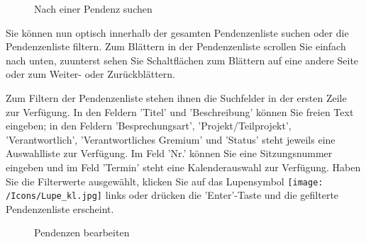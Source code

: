 \begin{figure}[H]
\caption{Nach einer Pendenz suchen}
\end{figure}

Sie können nun optisch innerhalb der gesamten Pendenzenliste suchen oder die Pendenzenliste filtern. Zum Blättern in der Pendenzenliste scrollen Sie einfach nach unten, zuunterst sehen Sie Schaltflächen zum Blättern auf eine andere Seite oder zum Weiter- oder Zurückblättern.

\begin{figure}[H]
\end{figure}

Zum Filtern der Pendenzenliste stehen ihnen die Suchfelder in der ersten Zeile zur Verfügung. In den Feldern 'Titel' und 'Beschreibung' können Sie freien Text eingeben; in den Feldern 'Besprechungsart', 'Projekt/Teilprojekt', 'Verantwortlich', 'Verantwortliches Gremium' und 'Status' steht jeweils eine Auswahlliste zur Verfügung. Im Feld 'Nr.' können Sie eine Sitzungsnummer eingeben und im Feld 'Termin' steht eine Kalenderauswahl zur Verfügung. Haben Sie die Filterwerte ausgewählt, klicken Sie auf das Lupensymbol \texttt{[image: /Icons/Lupe\_kl.jpg]}  links oder drücken die 'Enter'-Taste und die gefilterte Pendenzenliste erscheint.

\begin{figure}[H]
\caption{Pendenzen bearbeiten}
\end{figure}

